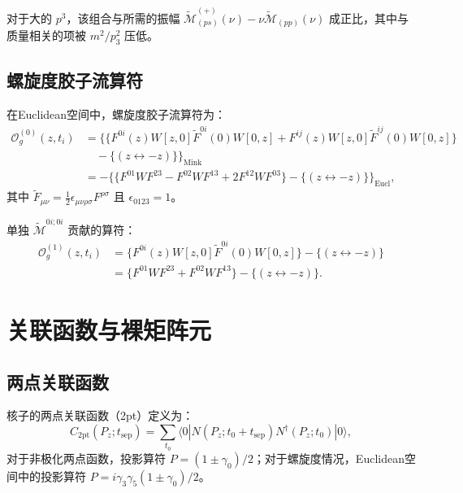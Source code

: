 \documentclass[11pt,a4paper]{article}
\newcommand{\tsep}{t_{\text{sep}}}
\newcommand{\Pz}{P_z}
\begin{document}
对于大的 $p^3$，该组合与所需的振幅 $\tilde{\mathcal{M}}^{(+)}_{(ps)}(\nu) - \nu \tilde{\mathcal{M}}_{(pp)}(\nu)$ 成正比，其中与质量相关的项被 $m^2/p_3^2$ 压低。

\subsection{螺旋度胶子流算符}

在Euclidean空间中，螺旋度胶子流算符为：
\begin{align}
    \mathcal{O}^{(0)}_g(z, t_i) &= \big\{ \{F^{0i}(z) W[z,0] \tilde{F}^{0i}(0) W[0,z] + F^{ij}(z) W[z,0] \tilde{F}^{ij}(0) W[0,z]\} \nonumber\\
    &\quad - \{ (z \leftrightarrow -z) \} \big\}_{\text{Mink}} \nonumber\\
    &= -\big\{ \{F^{01} W F^{23} - F^{02} W F^{13} + 2F^{12} W F^{03}\} - \{ (z \leftrightarrow -z) \} \big\}_{\text{Eucl}},
\end{align}
其中 $\tilde{F}_{\mu\nu} = \frac{1}{2}\epsilon_{\mu\nu\rho\sigma} F^{\rho\sigma}$ 且 $\epsilon_{0123} = 1$。

单独 $\tilde{\mathcal{M}}^{0i;0i}$ 贡献的算符：
\begin{align}
    \mathcal{O}^{(1)}_g(z, t_i) &= \{F^{0i}(z) W[z,0] \tilde{F}^{0i}(0) W[0,z]\} - \{ (z \leftrightarrow -z) \} \nonumber\\
    &= \{F^{01} W F^{23} + F^{02} W F^{13}\} - \{ (z \leftrightarrow -z) \}.
\end{align}

\section{关联函数与裸矩阵元}

\subsection{两点关联函数}

核子的两点关联函数（2pt）定义为：
\begin{equation}\label{eq:C2pt}
    C_{2\text{pt}}(\Pz; \tsep) = \sum_{t_0} \langle 0 | N(\Pz; t_0 + \tsep) N^\dagger(\Pz; t_0) | 0 \rangle,
\end{equation}
对于非极化两点函数，投影算符 $P = (1 \pm \gamma_0)/2$；对于螺旋度情况，Euclidean空间中的投影算符 $P = i\gamma_3\gamma_5(1 \pm \gamma_0)/2$。
\end{document}
